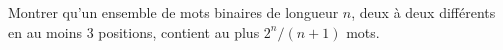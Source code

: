 Montrer qu'un ensemble de mots binaires de longueur $n$, deux à deux différents en au moins $3$ positions, contient au plus $2^n/(n + 1)$ mots.
